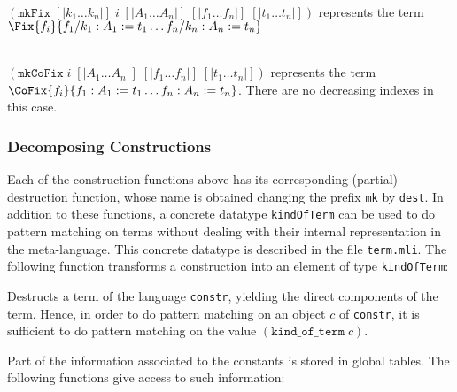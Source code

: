 \begin{description}
    {\\ $(\texttt{mkFix}\;[|k_1\ldots k_n |]\;i\;[|A_1\ldots
    A_n|]\;[|f_1\ldots f_n|]\;[|t_1\ldots t_n|])$ represents the term
    $\Fix{f_i}{f_1/k_1:A_1:=t_1 \ldots f_n/k_n:A_n:=t_n}$}

    {\\ $(\texttt{mkCoFix}\;i\;[|A_1\ldots
    A_n|]\;[|f_1\ldots f_n|]\;[|t_1\ldots t_n|])$ represents the term
    $\CoFix{f_i}{f_1:A_1:=t_1 \ldots f_n:A_n:=t_n}$. There are no
    decreasing indexes in this case.}
\end{description}

\subsubsection{Decomposing Constructions}

Each of the construction functions above has its corresponding
(partial) destruction function, whose name is obtained changing the
prefix \texttt{mk} by \texttt{dest}. In addition to these functions, a
concrete datatype \texttt{kindOfTerm} can be used to do pattern
matching on terms without dealing with their internal representation
in the meta-language. This concrete datatype is described in the \ocaml{}
file \texttt{term.mli}. The following function transforms a construction
into an element of type \texttt{kindOfTerm}:

\begin{description}
    {Destructs a term of the language \texttt{constr},
yielding the direct components of the term. Hence, in order to do 
pattern matching on an object $c$ of \texttt{constr}, it is sufficient
to do pattern matching on the value $(\texttt{kind\_of\_term}\;c)$.}
\end{description}

Part of the information associated to the constants is stored in 
global tables. The following functions give access to such 
information:

